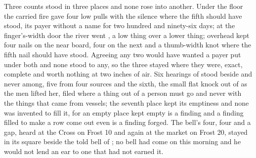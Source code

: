 \scenebreak

Three counts stood in three places and none rose into another. Under the floor the carried fire gave four low pulls with the silence where the fifth should have stood, its payer without a name for two hundred and ninety-six days; at the finger's-width door the river went , a low thing over a lower thing; overhead  kept four nails on the near board, four on the next and a thumb-width knot where the fifth nail should have stood. Agreeing any two would have wanted a payer put under both and none stood to any, so the three stayed where they were, exact, complete and worth nothing at two inches of air. Six hearings of  stood beside and never among, five from four sources and the sixth, the small flat knock out of  as the men lifted her, filed where a thing out of a person must go and never with the things that came from vessels; the seventh place kept its emptiness and none was invented to fill it, for an empty place kept empty is a finding and a finding filled to make a row come out even is a finding forged. The bell's four, four and a gap, heard at the Cross on Frost 10 and again at the market on Frost 20, stayed in its square beside the told bell of ; no bell had come on this morning and he would not lend an ear to one that had not earned it.

